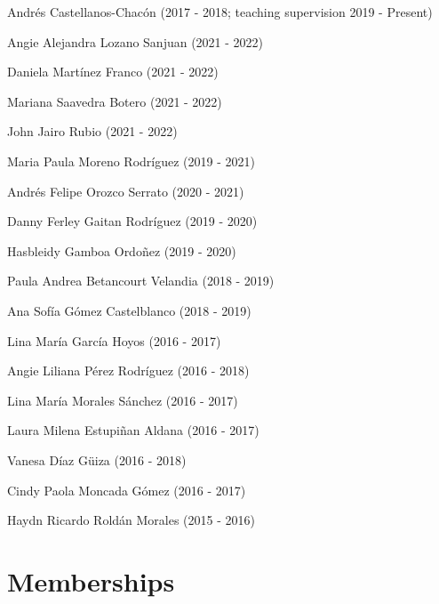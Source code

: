 \documentclass[11pt,a4paper,]{awesome-cv}
\begin{document}
\begin{cventries}
{\begin{cvitems}
\item Andrés Castellanos-Chacón (2017 - 2018; teaching supervision 2019 - Present)
\item Angie Alejandra Lozano Sanjuan (2021 - 2022)
\item Daniela Martínez Franco (2021 - 2022)
\item Mariana Saavedra Botero (2021 - 2022)
\item John Jairo Rubio (2021 - 2022)
\item Maria Paula Moreno Rodríguez (2019 - 2021)
\item Andrés Felipe Orozco Serrato (2020 - 2021)
\item Danny Ferley Gaitan Rodríguez (2019 - 2020)
\item Hasbleidy Gamboa Ordoñez (2019 - 2020)
\item Paula Andrea Betancourt Velandia  (2018 - 2019)
\item Ana Sofía Gómez Castelblanco (2018 - 2019)
\item Lina María García Hoyos  (2016 - 2017)
\item Angie Liliana Pérez Rodríguez  (2016 - 2018)
\item Lina María Morales Sánchez (2016 - 2017)
\item Laura Milena Estupiñan Aldana  (2016 - 2017)
\item Vanesa Díaz Güiza  (2016 - 2018)
\item Cindy Paola Moncada Gómez (2016 - 2017)
\item Haydn Ricardo Roldán Morales (2015 - 2016)
\end{cvitems}}
\end{cventries}

\hypertarget{memberships}{%
\section{Memberships}\label{memberships}}

\begin{cventries}
    \vspace{-4.0mm}
    \vspace{-4.0mm}
    \vspace{-4.0mm}
\end{cventries}
\end{document}
